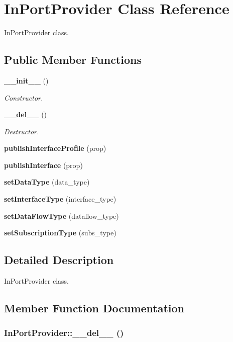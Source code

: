 \section{In\-Port\-Provider Class Reference}
\label{classInPortProvider}
In\-Port\-Provider class.  


\subsection*{Public Member Functions}
\begin{CompactItemize}
\item 
{\bf \_\-\_\-init\_\-\_\-} ()
\begin{CompactList}\small\item\em Constructor. \item\end{CompactList}\item 
{\bf \_\-\_\-del\_\-\_\-} ()
\begin{CompactList}\small\item\em Destructor. \item\end{CompactList}\item 
{\bf publish\-Interface\-Profile} (prop)
\item 
{\bf publish\-Interface} (prop)
\item 
{\bf set\-Data\-Type} (data\_\-type)
\item 
{\bf set\-Interface\-Type} (interface\_\-type)
\item 
{\bf set\-Data\-Flow\-Type} (dataflow\_\-type)
\item 
{\bf set\-Subscription\-Type} (subs\_\-type)
\end{CompactItemize}


\subsection{Detailed Description}
In\-Port\-Provider class. 



\subsection{Member Function Documentation}
\subsubsection{\setlength{\rightskip}{0pt plus 5cm}In\-Port\-Provider::\_\-\_\-del\_\-\_\- ()}\label{classInPortProvider_InPortProvidera1}


